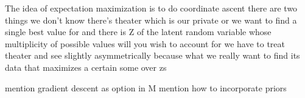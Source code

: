 




The idea of expectation maximization is to do coordinate ascent there are two
things we don't know there's theater which is our private or we want to find a
single best value for and there is Z of the latent random variable whose
multiplicity of possible values will you wish to account for we have to treat
theater and see slightly asymmetrically because what we really want to find its
data that maximizes a certain some over zs




mention gradient descent as option in M
mention how to incorporate priors






